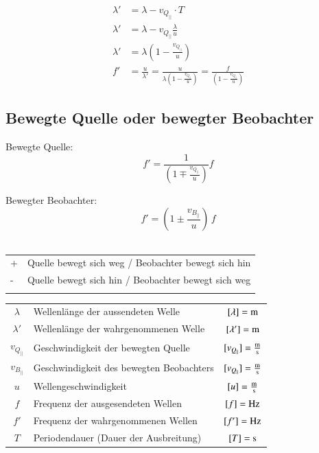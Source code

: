 \begin{align*}
\lambda' &= \lambda -v_{Q_{||}} \cdot T  \\
\lambda'&= \lambda -v_{Q_{||}} \frac{\lambda}{u}\\
\lambda' &= \lambda \left(1 - \frac{v_{Q_{||}}}{u}\right)  \\
f'&= \frac{u}{\lambda'} = \frac{u}{\lambda\left(1-\frac{v_{Q_{||}}}{u}\right)} = \frac{f}{\left(1-\frac{v_{Q_{||}}}{u}\right)}
\end{align*}

\subsection{Bewegte Quelle oder bewegter Beobachter}

\begin{minipage}{0.48\linewidth}
	\begin{center}
		Bewegte Quelle:
		$$ \boxed{f' = \frac{1}{\left(1 \mp \frac{v_{Q_{||}}}{u}\right)}f}$$
	\end{center}
\end{minipage}
\hfill
\begin{minipage}{0.48\linewidth}
	\begin{center}
		Bewegter Beobachter:
		$$ \boxed{f' = \left( 1 \pm \frac{v_{B_{||}}}{u}  \right) \, f }$$\\
	\end{center}
\end{minipage}


\begin{tabular}{ll}
+ & Quelle bewegt sich weg / Beobachter bewegt sich hin\\
- & Quelle bewegt sich hin / Beobachter bewegt sich weg\\
\\
\end{tabular}


\begin{tabular}{clc}
$\lambda$ & Wellenlänge der aussendeten Welle & $[\lambda] = \mathrm{m}$ \\
$\lambda'$ & Wellenlänge der wahrgenommenen Welle & $[\lambda'] = \mathrm{m}$ \\
$v_{Q_{||}}$ & Geschwindigkeit der bewegten Quelle & $[v_{Q_{||}}] = \frac{\mathrm{m}}{\mathrm{s}}$ \\
$v_{B_{||}}$ & Geschwindigkeit des bewegten Beobachters & $[v_{Q_{||}}] = \frac{\mathrm{m}}{\mathrm{s}}$ \\
$u$ & Wellengeschwindigkeit & $[u] = \frac{\mathrm{m}}{\mathrm{s}}$ \\
$f$ & Frequenz der ausgesendeten Wellen & $[f] = \mathrm{Hz}$ \\
$f'$ & Frequenz der wahrgenommenen Wellen & $[f'] = \mathrm{Hz}$ \\
$T$ & Periodendauer (Dauer der Ausbreitung) & $[T] = \mathrm{s}$ \\
\end{tabular}






